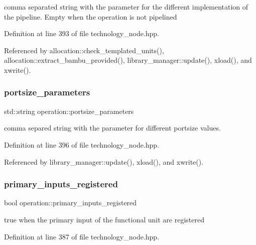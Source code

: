 comma separated string with the parameter for the different implementation of the pipeline. Empty when the operation is not pipelined 



Definition at line 393 of file technology\+\_\+node.\+hpp.



Referenced by allocation\+::check\+\_\+templated\+\_\+units(), allocation\+::extract\+\_\+bambu\+\_\+provided(), library\+\_\+manager\+::update(), xload(), and xwrite().

\mbox{\label{structoperation_a235782b551778467d671ee29d19407ee}} 
\subsubsection{\texorpdfstring{portsize\+\_\+parameters}{portsize\_parameters}}
{\footnotesize\ttfamily std\+::string operation\+::portsize\+\_\+parameters}



comma separed string with the parameter for different portsize values. 



Definition at line 396 of file technology\+\_\+node.\+hpp.



Referenced by library\+\_\+manager\+::update(), xload(), and xwrite().

\mbox{\label{structoperation_a9fae9437b8ca1d72d15b692e0d095c8d}} 
\subsubsection{\texorpdfstring{primary\+\_\+inputs\+\_\+registered}{primary\_inputs\_registered}}
{\footnotesize\ttfamily bool operation\+::primary\+\_\+inputs\+\_\+registered}



true when the primary input of the functional unit are registered 



Definition at line 387 of file technology\+\_\+node.\+hpp.



